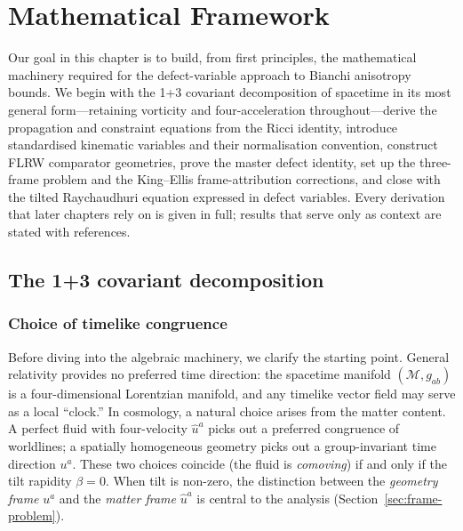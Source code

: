 
\chapter{Mathematical Framework}\label{ch:framework}

Our goal in this chapter is to build, from first principles, the
mathematical machinery required for the defect-variable approach
to Bianchi anisotropy bounds.  We begin with the 1+3 covariant
decomposition of spacetime in its most general form---retaining
vorticity and four-acceleration throughout---derive the
propagation and constraint equations from the Ricci identity,
introduce standardised kinematic variables and their
normalisation convention, construct FLRW comparator geometries,
prove the master defect identity, set up the three-frame problem
and the King--Ellis frame-attribution corrections, and close with
the tilted Raychaudhuri equation expressed in defect variables.
Every derivation that later chapters rely on is given in full;
results that serve only as context are stated with references.


\section{The 1+3 covariant decomposition}\label{sec:13cov}

\subsection{Choice of timelike congruence}\label{sec:congruence}

Before diving into the algebraic machinery, we clarify the
starting point.  General relativity provides no preferred time
direction: the spacetime manifold $(\mathcal{M}, g_{ab})$ is a
four-dimensional Lorentzian manifold, and any timelike vector
field may serve as a local ``clock.''  In cosmology, a natural
choice arises from the matter content.  A perfect fluid with
four-velocity $\hat{u}^a$ picks out a preferred congruence of
worldlines; a spatially homogeneous geometry picks out a
group-invariant time direction $u^a$.  These two choices coincide
(the fluid is \emph{comoving}) if and only if the tilt rapidity
$\beta = 0$.  When tilt is non-zero, the distinction between the
\emph{geometry frame} $u^a$ and the \emph{matter frame}
$\hat{u}^a$ is central to the analysis
(Section~\ref{sec:frame-problem}).

